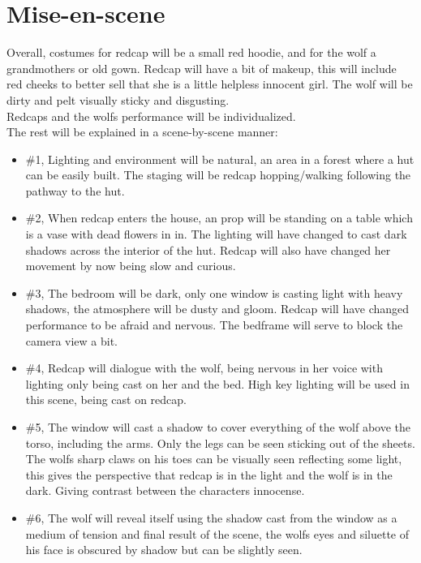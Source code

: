 \documentclass{article}
\begin{document}
\section{Mise-en-scene}
Overall, costumes for redcap will be a small red hoodie, and for the wolf a grandmothers or old gown. Redcap will have a bit of makeup, this will include red cheeks to better sell that she is a little helpless innocent girl. The wolf will be dirty and pelt visually sticky and disgusting.\\ Redcaps and the wolfs performance will be individualized.\\
The rest will be explained in a scene-by-scene manner:\\
\begin{itemize}
    \item \#1, Lighting and environment will be natural, an area in a forest where a hut can be easily built. The staging will be redcap hopping/walking following the pathway to the hut.
    \item \#2, When redcap enters the house, an prop will be standing on a table which is a vase with dead flowers in in. The lighting will have changed to cast dark shadows across the interior of the hut. Redcap will also have changed her movement by now being slow and curious.
    \item \#3, The bedroom will be dark, only one window is casting light with heavy shadows, the atmosphere will be dusty and gloom. Redcap will have changed performance to be afraid and nervous. The bedframe will serve to block the camera view a bit.
    \item \#4, Redcap will dialogue with the wolf, being nervous in her voice with lighting only being cast on her and the bed. High key lighting will be used in this scene, being cast on redcap.
    \item \#5, The window will cast a shadow to cover everything of the wolf above the torso, including the arms. Only the legs can be seen sticking out of the sheets. The wolfs sharp claws on his toes can be visually seen reflecting some light, this gives the perspective that redcap is in the light and the wolf is in the dark. Giving contrast between the characters innocense.
    \item \#6, The wolf will reveal itself using the shadow cast from the window as a medium of tension and final result of the scene, the wolfs eyes and siluette of his face is obscured by shadow but can be slightly seen.
\end{itemize}
\end{document}
